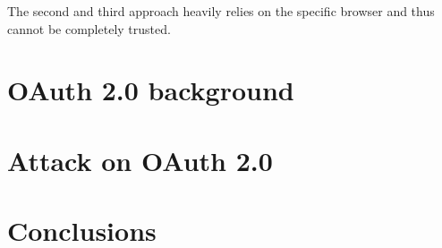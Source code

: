 \documentclass[journal,a4paper,twoside]{template/IEEEtran}
\begin{document}
The second and third approach heavily relies on the specific browser and thus cannot be completely trusted.%

\section{OAuth 2.0 background}

\section{Attack on OAuth 2.0}

\section{Conclusions}

\small



\vfill
\end{document}

